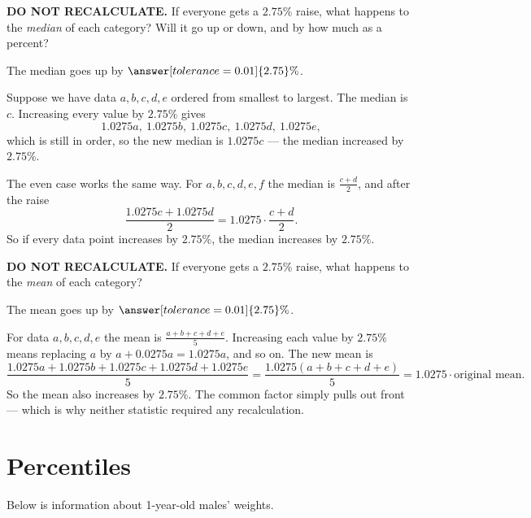 \documentclass[12pt]{ximera}
\begin{document}
\begin{problem}
\textbf{DO NOT RECALCULATE.} If everyone gets a $2.75\%$ raise, what happens to the
\emph{median} of each category? Will it go up or down, and by how much as a percent?

The median goes up by $\answer[tolerance=0.01]{2.75}\%$.

\begin{solution}
Suppose we have data $a, b, c, d, e$ ordered from smallest to largest. The median is
$c$. Increasing every value by $2.75\%$ gives
\[
1.0275a,\ 1.0275b,\ 1.0275c,\ 1.0275d,\ 1.0275e,
\]
which is still in order, so the new median is $1.0275c$ --- the median increased by
$2.75\%$.

The even case works the same way. For $a, b, c, d, e, f$ the median is
$\frac{c+d}{2}$, and after the raise
\[
\frac{1.0275c + 1.0275d}{2} = 1.0275 \cdot \frac{c+d}{2}.
\]
So if every data point increases by $2.75\%$, the median increases by $2.75\%$.
\end{solution}
\end{problem}

\begin{problem}
\textbf{DO NOT RECALCULATE.} If everyone gets a $2.75\%$ raise, what happens to the
\emph{mean} of each category?

The mean goes up by $\answer[tolerance=0.01]{2.75}\%$.

\begin{solution}
For data $a, b, c, d, e$ the mean is $\frac{a+b+c+d+e}{5}$. Increasing each value by
$2.75\%$ means replacing $a$ by $a + 0.0275a = 1.0275a$, and so on. The new mean is
\[
\frac{1.0275a + 1.0275b + 1.0275c + 1.0275d + 1.0275e}{5}
= \frac{1.0275(a+b+c+d+e)}{5}
= 1.0275 \cdot \text{original mean}.
\]
So the mean also increases by $2.75\%$. The common factor simply pulls out front ---
which is why neither statistic required any recalculation.
\end{solution}
\end{problem}

\section*{Percentiles}

Below is information about 1-year-old males' weights.

\end{document}
